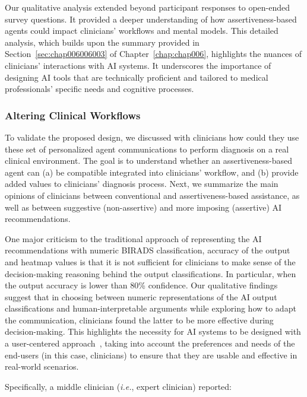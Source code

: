 \textcolor{revised}{Our qualitative analysis extended beyond participant responses to open-ended survey questions.
It provided a deeper understanding of how assertiveness-based agents could impact clinicians' workflows and mental models.
This detailed analysis, which builds upon the summary provided in Section~\ref{sec:chap006006003} of Chapter~\ref{chap:chap006}, highlights the nuances of clinicians' interactions with \ac{AI} systems.
It underscores the importance of designing \ac{AI} tools that are technically proficient and tailored to medical professionals' specific needs and cognitive processes.}

\subsubsection{Altering Clinical Workflows}
\label{sec:app005007003001}

To validate the proposed design, we discussed with clinicians how could they use these set of personalized agent communications to perform diagnosis on a real clinical environment.
The goal is to understand whether an assertiveness-based agent can (a) be compatible integrated into clinicians' workflow, and (b) provide added values to clinicians' diagnosis process.
Next, we summarize the main opinions of clinicians between conventional and assertiveness-based assistance, as well as between suggestive (non-assertive) and more imposing (assertive) AI recommendations.

One major criticism to the traditional approach of representing the AI recommendations with numeric BIRADS classification, accuracy of the output and heatmap values is that it is not sufficient for clinicians to make sense of the decision-making reasoning behind the output classifications.
In particular, when the output accuracy is lower than 80\% confidence.
Our qualitative findings suggest that in choosing between numeric representations of the AI output classifications and human-interpretable arguments while exploring how to adapt the communication, clinicians found the latter to be more effective during decision-making.
This highlights the necessity for AI systems to be designed with a user-centered approach~\cite{10.1145/3491102.3517789}, taking into account the preferences and needs of the end-users (in this case, clinicians) to ensure that they are usable and effective in real-world scenarios.

\vspace{2.5mm}

\noindent
Specifically, a middle clinician ({\it i.e.}, expert clinician) reported:

